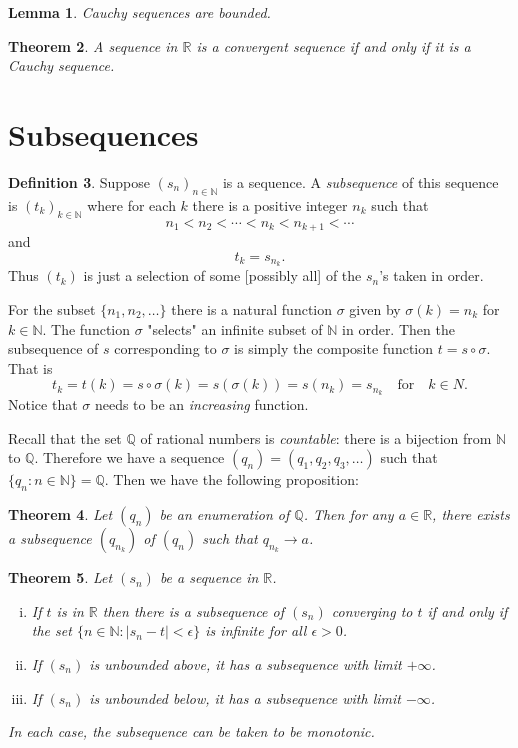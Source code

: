 \documentclass[12pt, lettersize]{book}
\theoremstyle{plain}
\newtheorem{thm}{Theorem}[section]
\newtheorem{lem}[thm]{Lemma}
\theoremstyle{definition}
\newtheorem{dfn}[thm]{Definition}
\theoremstyle{remark}
\newcommand{\R}{\mathbb{R}}
\newcommand{\N}{\mathbb{N}}
\newcommand{\Q}{\mathbb{Q}}
\begin{document}
	\begin{lem}
		Cauchy sequences are bounded.
	\end{lem}
	
	\begin{thm}\label{def:cauchy iff convergent}
		A sequence in $\R$ is a convergent sequence if and only if it is a Cauchy sequence.
	\end{thm}
	\newpage
	
	\section{Subsequences}
		\begin{dfn}
			Suppose $(s_n)_{n\in\mathbb{N}}$ is a sequence. A \emph{subsequence} of this sequence is $(t_k)_{k\in\mathbb{N}}$ where for each $k$ there is a positive integer $n_k$ such that
			\begin{equation*}
				n_1<n_2<\cdots<n_k<n_{k+1}<\cdots
			\end{equation*}
			and
			\begin{equation*}
				t_k=s_{n_k}.
			\end{equation*}
			Thus $(t_k)$ is just a selection of some [possibly all] of the $s_n$'s taken in order.
		\end{dfn}
		For the subset $\{n_1,n_2,\dots\}$ there is a natural function $\sigma$ given by $\sigma(k)=n_k$ for $k\in\mathbb{N}$. The function $\sigma$ "selects" an infinite subset of $\mathbb{N}$ in order. Then
		the subsequence of $s$ corresponding to $\sigma$ is simply the composite function $t=s\circ\sigma$. That is
		\begin{displaymath}
			t_k=t(k)=s\circ\sigma(k)=s(\sigma(k))=s(n_k)=s_{n_k}\quad\text{for}\quad k\in N.
		\end{displaymath}
		Notice that $\sigma$ needs to be an \emph{increasing} function.
		 
		Recall that the set $\Q$ of rational numbers is \emph{countable}: there is a bijection from $\N$ to $\Q$. Therefore we have a sequence $(q_n)=(q_1,q_2,q_3,\dots)$ such that $\{q_n: n\in\N\}=\Q$. Then we have the following proposition:
		\begin{thm}
			Let $(q_n)$ be an enumeration of $\Q$. Then for any $a\in\R$, there exists a subsequence $(q_{n_k})$ of $(q_n)$ such that $q_{n_k}\rightarrow a$.
		\end{thm}
	
		\setcounter{equation}{0}
		\begin{thm}\label{def:limit-subseq}
			Let $(s_n)$ be a sequence in $\R$.
			\begin{enumerate}[(i)]
				\item If $t$ is in $\mathbb{R}$ then there is a subsequence of $(s_n)$ converging to $t$ if and only if
				the set $\{n\in\mathbb{N}: |s_n-t|<\epsilon\}$ is \emph{infinite} for all $\epsilon>0$.
				\item If $(s_n)$ is unbounded above, it has a subsequence with limit $+\infty$.
				\item If $(s_n)$ is unbounded below, it has a subsequence with limit $-\infty$.
			\end{enumerate}
			In each case, the subsequence can be taken to be \emph{monotonic}.
		\end{thm}
		
\end{document}
